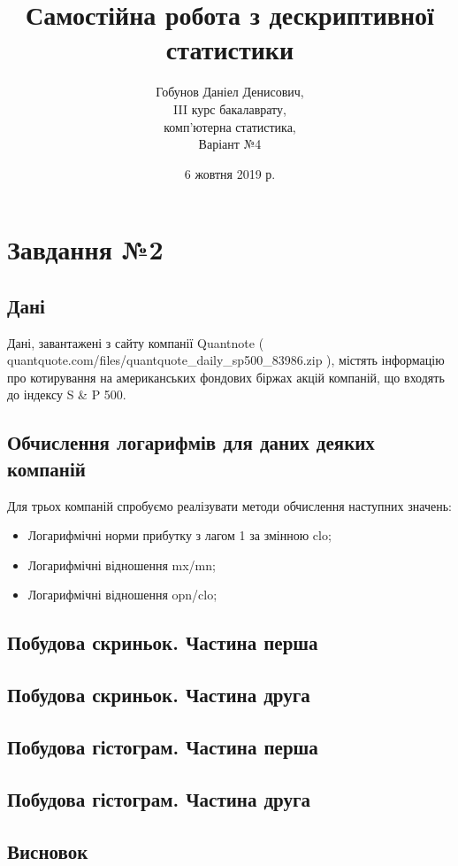 \documentclass{article}
\title{
Самостійна робота з дескриптивної статистики
}
\date{6 жовтня 2019 р.}
\author{
Гобунов Даніел Денисович,\\
III курс бакалаврату,\\
комп'ютерна статистика,\\
Варіант №4
}
\begin{document}
\maketitle
\section{Завдання №2}
\subsection{Дані}
Дані, завантажені з сайту компанії Quantnote ( quantquote.com/files/quantquote\_daily\_sp500\_83986.zip ), містять інформацію про котирування на американських фондових біржах акцій компаній, що входять до індексу S \& P 500.
\subsection{Обчислення логарифмів для даних деяких компаній}

Для трьох компаній спробуємо реалізувати методи обчислення наступних значень:

\begin{itemize}
\item Логарифмічні норми прибутку з лагом 1 за змінною clo;
\item Логарифмічні відношення mx/mn;
\item Логарифмічні відношення opn/clo;
\end{itemize}

\subsection{Побудова скриньок. Частина перша}
\subsection{Побудова скриньок. Частина друга}
\subsection{Побудова гістограм. Частина перша}
\subsection{Побудова гістограм. Частина друга}
\subsection{Висновок}
\end{document}
